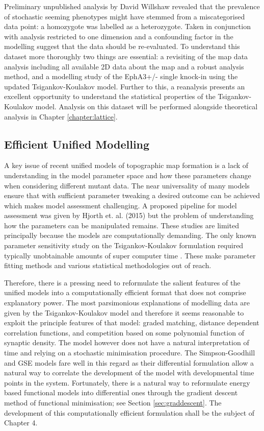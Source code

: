 Preliminary unpublished analysis by David Willshaw revealed that the prevalence of stochastic seeming phenotypes might have stemmed from a miscategorised data point: a homozygote was labelled as a heterozygote. Taken in conjunction with analysis restricted to one dimension and a confounding factor in the modelling suggest that the data should be re-evaluated. To understand this dataset more thoroughly two things are essential: a revisiting of the map data analysis including all available 2D data about the map and a robust analysis method, and a modelling study of the EphA3+/- single knock-in using the updated Tsigankov-Koulakov model. Further to this, a reanalysis presents an excellent opportunity to understand the statistical properties of the Tsigankov-Koulakov model. Analysis on this dataset will be performed alongside theoretical analysis in Chapter \ref{chapter:lattice}.
\subsection{Efficient Unified Modelling \label{sec:efficientmodelling}}
A key issue of recent unified models of topographic map formation is a lack of understanding in the model parameter space and how these parameters change when considering different mutant data. The near universality of many models ensure that with sufficient parameter tweaking a desired outcome can be achieved which makes model assessment challenging. A proposed pipeline for model assessment was given by Hjorth et. al. (2015) but the problem of understanding how the parameters can be manipulated remains. These studies are limited principally because the models are computationally demanding. The only known parameter sensitivity study on the Tsigankov-Koulakov formulation required typically unobtainable amounts of super computer time \cite{Tikidji-Hamburyan2016-sn}. These make parameter fitting methods and various statistical methodologies out of reach.

Therefore, there is a pressing need to reformulate the salient features of the unified models into a computationally efficient format that does not comprise explanatory power. The most parsimonious explanations of modelling data are given by the Tsigankov-Koulakov model and therefore it seems reasonable to exploit the principle features of that model: graded matching, distance dependent correlation functions, and competition based on some polynomial function of synaptic density. The model however does not have a natural interpretation of time and relying on a stochastic minimisation procedure. The Simpson-Goodhill and GSE models fare well in this regard as their differential formulation allow a natural way to correlate the development of the model with developmental time points in the system. Fortunately, there is a natural way to reformulate energy based functional models into differential ones through the gradient descent method of functional minimisation; see Section \ref{sec:graddescent}. The development of this computationally efficient formulation shall be the subject of Chapter 4.

